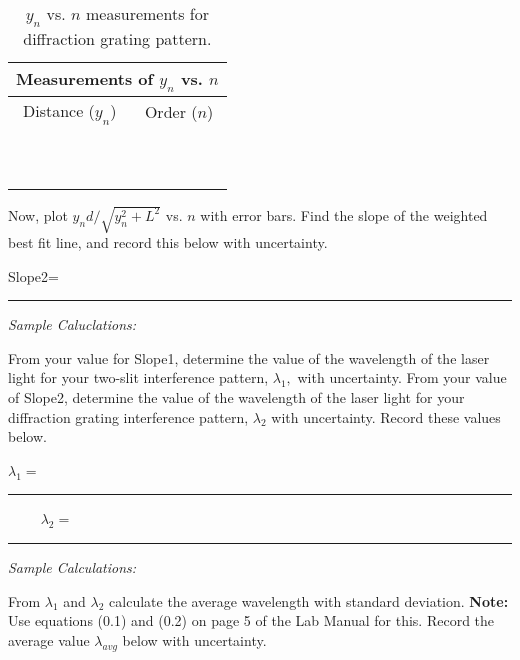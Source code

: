 \begin{table}[htb]
\begin{center}
\begin{tabular}{|c|c|}
\hline
\multicolumn{2}{|c|}{Measurements of $y_n$ vs. $n$} \\
\hline
Distance ($y_n$) & Order ($n$) \\
\hline
\hspace*{3cm} & \hspace*{3cm}  \\
& \\
\hline
& \\
&  \\
\hline
& \\
& \\
\hline
&  \\
&  \\
\hline
&  \\
&  \\
\hline
\end{tabular}
\end{center}
\caption{$y_n$ vs. $n$ measurements for diffraction grating pattern.}
\label {tab:DI:Grating}
\end{table}

\noindent
Now, plot $y_nd/ \sqrt{y_n^2 + L^2}$ vs. $n$ with error bars. Find the slope of the
weighted best fit line, and record this below with uncertainty.

\begin{center}
Slope2=~ \rule{3cm}{.1mm}
\end{center}
\vspace*{.5cm}
\noindent
{\it Sample Caluclations:}

\newpage
\noindent
From your value for Slope1, determine the value of the wavelength of the laser light
for your two-slit interference pattern, $\lambda _1,$ with uncertainty. From your
value of Slope2, determine the value of the wavelength of the laser light for your
diffraction grating interference pattern, $\lambda _2$ with uncertainty. Record these
values below.

\begin{center}
$\lambda _1=$~ \rule{3cm}{.1mm} ~~~~
$\lambda _2=$~ \rule{3cm}{.1mm}
\end{center}
\vspace*{.5cm}

\noindent
{\it Sample Calculations:}
\vspace*{1cm}

\noindent
From $\lambda _1$ and $\lambda _2$ calculate the average wavelength with standard
deviation. {\bf Note:} Use equations (0.1) and (0.2) on page 5 of the Lab Manual for
this. Record the average value $\lambda _{avg}$ below with uncertainty.


